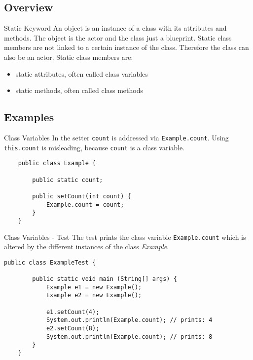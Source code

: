\subsection{Overview}
\begin{frame}{Static Keyword}
	An object is an instance of a class with its attributes and methods.
	The object is the actor and the class just a blueprint.
	\vfill
	Static class members are not linked to a certain instance of the class.
	Therefore the class can also be an actor.
	\vfill
	Static class members are:
	\begin{itemize}
		\item static attributes, often called class variables
		\item static methods, often called class methods
	\end{itemize}
\end{frame}

\subsection{Examples}
\begin{frame}[fragile]{Class Variables}
	In the setter \texttt{count} is addressed via \texttt{Example.count}.
	Using \texttt{this.count} is misleading, because \texttt{count} is a class variable.	
	\begin{lstlisting}
	public class Example {
	
	    public static count;

	    public setCount(int count) {
	        Example.count = count;
	    }
	}
	\end{lstlisting}
\end{frame}

\begin{frame}[fragile]{Class Variables - Test}
	The test prints the class variable \texttt{Example.count} which is altered
	by the different instances of the class \emph{Example}.	
	\begin{lstlisting}[basicstyle=\ttfamily\scriptsize]
	public class ExampleTest {
	
	    public static void main (String[] args) {
	        Example e1 = new Example();
	        Example e2 = new Example();
	        
	        e1.setCount(4);
	        System.out.println(Example.count); // prints: 4
	        e2.setCount(8);
	        System.out.println(Example.count); // prints: 8
	    }
	}
	\end{lstlisting}
\end{frame}


